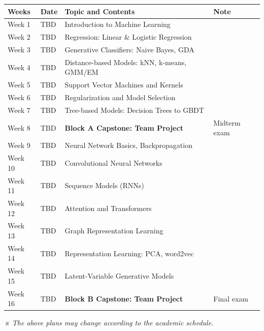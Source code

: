 \documentclass[11pt,a4paper]{article}
\begin{document}
{\small
\begin{tabular}{|p{1.6cm}|p{1.6cm}|p{7.3cm}|p{5.6cm}|}
\hline
\rowcolor{hdrgray}\textbf{Weeks} & \textbf{Date} & \textbf{Topic and Contents} & \textbf{Note} \\
\hline
Week 1 & TBD & Introduction to Machine Learning & \\
\hline
Week 2 & TBD & Regression: Linear \& Logistic Regression & \\
\hline
Week 3 & TBD & Generative Classifiers: Naive Bayes, GDA & \\
\hline
Week 4 & TBD & Distance-based Models: kNN, k-means, GMM/EM & \\
\hline
Week 5 & TBD & Support Vector Machines and Kernels & \\
\hline
Week 6 & TBD & Regularization and Model Selection & \\
\hline
Week 7 & TBD & Tree-based Models: Decision Trees to GBDT & \\
\hline
Week 8 & TBD & \textbf{Block A Capstone: Team Project} & Midterm exam \\
\hline
Week 9 & TBD & Neural Network Basics, Backpropagation & \\
\hline
Week 10 & TBD & Convolutional Neural Networks & \\
\hline
Week 11 & TBD & Sequence Models (RNNs) & \\
\hline
Week 12 & TBD & Attention and Transformers & \\
\hline
Week 13 & TBD & Graph Representation Learning & \\
\hline
Week 14 & TBD & Representation Learning: PCA, word2vec & \\
\hline
Week 15 & TBD & Latent-Variable Generative Models & \\
\hline
Week 16 & TBD & \textbf{Block B Capstone: Team Project} & Final exam \\
\hline
\end{tabular}
}

\vspace{2mm}
\textit{※ The above plans may change according to the academic schedule.}
\end{document}
